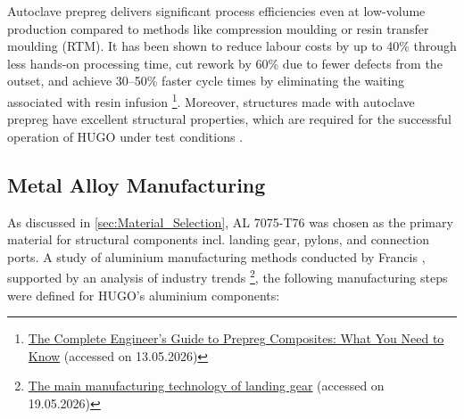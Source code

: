 

Autoclave prepreg delivers significant process efficiencies even at low-volume production compared to methods like compression moulding or resin transfer moulding (RTM). It has been shown to reduce labour costs by up to 40\% through less hands-on processing time, cut rework by 60\% due to fewer defects from the outset, and achieve 30--50\% faster cycle times by eliminating the waiting associated with resin infusion \footnote{\label{url:fnprepreg}\href{https://incomepultrusion.com/pre-preg-comprehensive-guide-on-definition-characteristics-types-and-applications/}{The Complete Engineer's Guide to Prepreg Composites: What You Need to Know} (accessed on 13.05.2026)}. Moreover, structures made with autoclave prepreg have excellent structural properties, which are required for the successful operation of HUGO under test conditions . 








\subsection{Metal Alloy Manufacturing}
As discussed in \autoref{sec:Material_Selection}, AL 7075-T76 was chosen as the primary material for structural components incl. landing gear, pylons, and connection ports. A study of aluminium manufacturing methods conducted by Francis \cite{FRANCIS2024245}, supported by an analysis of industry trends \footnote{\label{fn:landinggear}\href{https://www.szsunbright.com/news-show-1033791.html}{The main manufacturing technology of landing gear} (accessed on 19.05.2026)}, the following manufacturing steps were defined for HUGO's aluminium components: 

